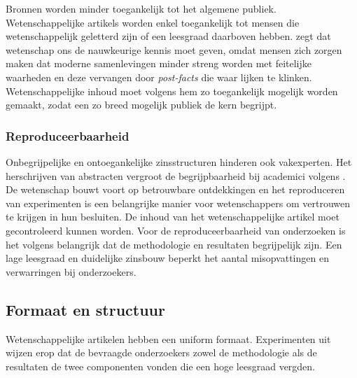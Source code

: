 Bronnen worden minder toegankelijk tot het algemene publiek. Wetenschappelijke artikels worden enkel toegankelijk tot mensen die wetenschappelijk geletterd zijn of een leesgraad daarboven hebben. \textcite{Ennals2010} zegt dat wetenschap ons de nauwkeurige kennis moet geven, omdat mensen zich zorgen maken dat moderne samenlevingen minder streng worden met feitelijke waarheden en deze vervangen door \textit{post-facts} die waar lijken te klinken. Wetenschappelijke inhoud moet volgens hem zo toegankelijk mogelijk worden gemaakt, zodat een zo breed mogelijk publiek de kern begrijpt.

\subsubsection{Reproduceerbaarheid}

Onbegrijpelijke en ontoegankelijke zinsstructuren hinderen ook vakexperten. Het herschrijven van abstracten vergroot de begrijpbaarheid bij academici volgens \textcite{Hartley1999, Snow2010}. De wetenschap bouwt voort op betrouwbare ontdekkingen en het reproduceren van experimenten is een belangrijke manier voor wetenschappers om vertrouwen te krijgen in hun besluiten. De inhoud van het wetenschappelijke artikel moet gecontroleerd kunnen worden. Voor de reproduceerbaarheid van onderzoeken is het volgens \textcite{McNutt2014} belangrijk dat de methodologie en resultaten begrijpelijk zijn. Een lage leesgraad en duidelijke zinsbouw beperkt het aantal misopvattingen en verwarringen bij onderzoekers.


\subsection{Formaat en structuur}

Wetenschappelijke artikelen hebben een uniform formaat. Experimenten uit \textcite{Hubbard2017} wijzen erop dat de bevraagde onderzoekers zowel de methodologie als de resultaten de twee componenten vonden die een hoge leesgraad vergden. 




